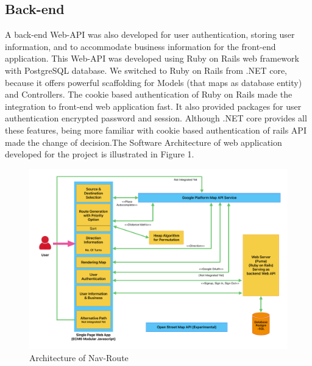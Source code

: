 \documentclass{article}
\begin{document}
\subsection{Back-end}
A back-end Web-API was also developed for user authentication, storing user information, and to accommodate business information for the front-end application. This Web-API was developed using Ruby on Rails web framework with PostgreSQL database. We switched to Ruby on Rails from .NET core, because it offers powerful scaffolding for Models (that maps as database entity) and Controllers. The cookie based authentication of Ruby on Rails made the integration to front-end web application fast. It also provided packages for user authentication encrypted password and session. Although .NET core provides all these features, being more familiar with cookie based authentication of rails API made the change of decision.The Software Architecture of web application developed for the project is illustrated in Figure 1.

\begin{figure}
  \centering
  \includegraphics[width=1\textwidth]{Architecture_v2.pdf}
  \caption{Architecture of Nav-Route}
  \label{fig:example}
\end{figure}
\end{document}
